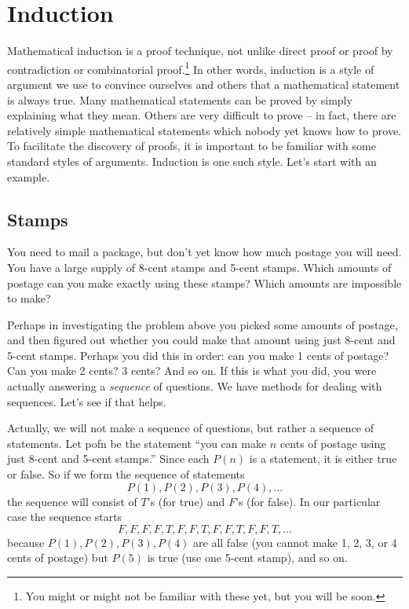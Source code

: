 \documentclass[12pt]{article}
\begin{document}
\section{Induction}\label{sec:induction}

Mathematical induction is a proof technique, not unlike direct proof or proof by contradiction or combinatorial proof.\footnote{You might or might not be familiar with these yet, but you will be soon.}  In other words, induction is a style of argument we use to convince ourselves and others that a mathematical statement is always true.  Many mathematical statements can be proved by simply explaining what they mean.  Others are very difficult to prove -- in fact, there are relatively simple mathematical statements which nobody yet knows how to prove.  To facilitate the discovery of proofs, it is important to be familiar with some standard styles of arguments.  Induction is one such style.  Let's start with an example.

\subsection{Stamps}

\begin{activity}
  You need to mail a package, but don't yet know how much postage you will need. You have
a large supply of 8-cent stamps and 5-cent stamps. Which amounts of postage can you make
exactly using these stamps? Which amounts are impossible to make?
\end{activity}

Perhaps in investigating the problem above you picked some amounts of postage, and then figured out whether you could make that amount using just 8-cent and 5-cent stamps.  Perhaps you did this in order: can you make 1 cents of postage?  Can you make 2 cents?  3 cents? And so on.  If this is what you did, you were actually answering a {\em sequence} of questions.  We have methods for dealing with sequences.  Let's see if that helps.

Actually, we will not make a sequence of questions, but rather a sequence of statements.  Let \gls{pofn} be the statement ``you can make $n$ cents of postage using just 8-cent and 5-cent stamps.''  Since each $P(n)$ is a statement, it is either true or false.  So if we form the sequence of statements
\[P(1), P(2), P(3), P(4), \ldots\]
the sequence will consist of $T$'s (for true) and $F$'s (for false).  In our particular case the sequence starts
\[F,F,F,F,T,F,F,T,F,F,T,F,F,T,\ldots\]
because $P(1), P(2), P(3), P(4)$ are all false (you cannot make 1, 2, 3, or 4 cents of postage) but $P(5)$ is true (use one 5-cent stamp), and so on.  
\end{document}
